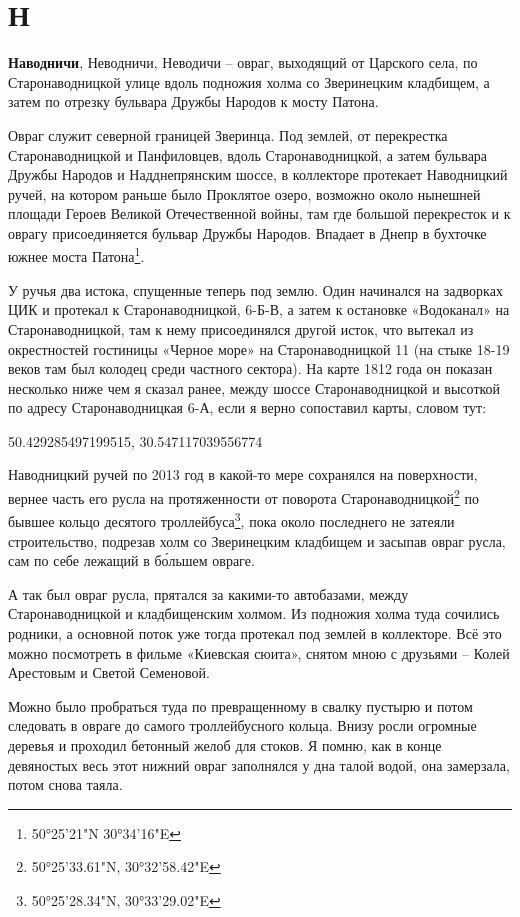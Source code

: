\chapter*{Н}

\textbf{Наводничи}, Неводничи, Неводичи – овраг, выходящий от Царского села, по Старонаводницкой улице вдоль подножия холма со Зверинецким кладбищем, а затем по отрезку бульвара Дружбы Народов к мосту Патона. 

Овраг служит северной границей Зверинца. Под землей, от перекрестка Старонаводницкой и Панфиловцев, вдоль Старонаводницкой, а затем бульвара Дружбы Народов и Надднепрянским шоссе, в коллекторе протекает Наводницкий ручей, на котором раньше было Проклятое озеро, возможно около нынешней площади Героев Великой Отечественной войны, там где большой перекресток и к оврагу присоединяется бульвар Дружбы Народов. Впадает в Днепр в бухточке южнее моста Патона\footnote{50°25'21"N 30°34'16"E}.

У ручья два истока, спущенные теперь под землю. Один начинался на задворках ЦИК и протекал к Старонаводницкой, 6-Б-В, а затем к остановке «Водоканал» на Старонаводницкой, там к нему присоединялся другой исток, что вытекал из окрестностей гостиницы «Черное море» на Старонаводницкой 11 (на стыке 18-19 веков там был колодец среди частного сектора). На карте 1812 года он показан несколько ниже чем я сказал ранее, между шоссе Старонаводницкой и высоткой по адресу Старонаводницкая 6-А, если я верно сопоставил карты, словом тут:

50.429285497199515, 30.547117039556774

Наводницкий ручей по 2013 год в какой-то мере сохранялся на поверхности, вернее часть его русла на протяженности от поворота Старонаводницкой\footnote{50°25'33.61"N, 30°32'58.42"E} по бывшее кольцо десятого троллейбуса\footnote{ 50°25'28.34"N, 30°33'29.02"E}, пока около последнего не затеяли строительство, подрезав холм со Зверинецким кладбищем и засыпав овраг русла, сам по себе лежащий в б\'ольшем овраге. 

А так был овраг русла, прятался за какими-то автобазами, между Старонаводницкой и кладбищенским холмом. Из подножия холма туда сочились родники, а основной поток уже тогда протекал под землей в коллекторе. Всё это можно посмотреть в фильме «Киевская сюита», снятом мною с друзьями – Колей Арестовым и Светой Семеновой.

Можно было пробраться туда по превращенному в свалку пустырю и потом следовать в овраге до самого троллейбусного кольца. Внизу росли огромные деревья и проходил бетонный желоб для стоков. Я помню, как в конце девяностых весь этот нижний овраг заполнялся у дна талой водой, она замерзала, потом снова таяла.

